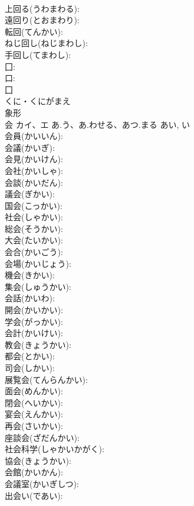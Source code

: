 \documentclass[8pt]{extreport}
\begin{document}
\begin{CJK}{UTF8}{min}
\\	上回る(うわまわる): 
\\	遠回り(とおまわり): 
\\	転回(てんかい): 
\\	ねじ回し(ねじまわし): 
\\	手回し(てまわし): 
\\	囗: 
\\	口: 
\\	囗	
\\	くに・くにがまえ	
\\	象形 
\\	会	カイ、エ	あ.う、あ.わせる、あつ.まる	あい, い	
\\	会員(かいいん): 
\\	会議(かいぎ): 
\\	会見(かいけん): 
\\	会社(かいしゃ): 
\\	会談(かいだん): 
\\	議会(ぎかい): 
\\	国会(こっかい): 
\\	社会(しゃかい): 
\\	総会(そうかい): 
\\	大会(たいかい): 
\\	会合(かいごう): 
\\	会場(かいじょう): 
\\	機会(きかい): 
\\	集会(しゅうかい): 
\\	会話(かいわ): 
\\	開会(かいかい): 
\\	学会(がっかい): 
\\	会計(かいけい): 
\\	教会(きょうかい): 
\\	都会(とかい): 
\\	司会(しかい): 
\\	展覧会(てんらんかい): 
\\	面会(めんかい): 
\\	閉会(へいかい): 
\\	宴会(えんかい): 
\\	再会(さいかい): 
\\	座談会(ざだんかい): 
\\	社会科学(しゃかいかがく): 
\\	協会(きょうかい): 
\\	会館(かいかん): 
\\	会議室(かいぎしつ): 
\\	出会い(であい): 

\end{CJK}
\end{document}
